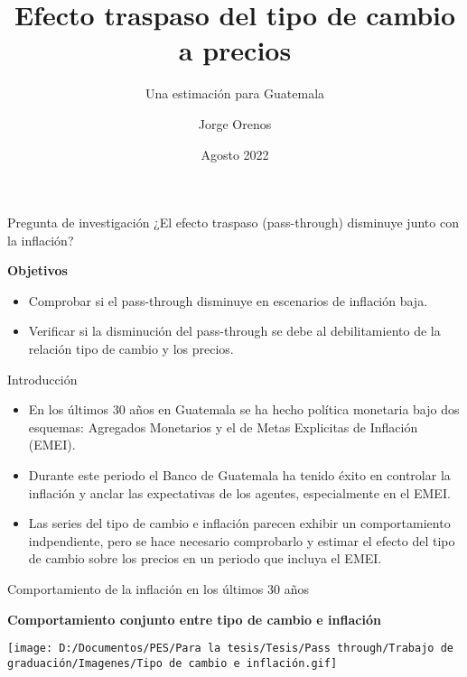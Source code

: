 \documentclass[
  ignorenonframetext,
]{beamer}
\title{Efecto traspaso del tipo de cambio a precios}
\subtitle{Una estimación para Guatemala}
\author{Jorge Orenos}
\date{Agosto 2022}
\providecommand{\tightlist}{%
  \setlength{\itemsep}{0pt}\setlength{\parskip}{0pt}}
\begin{document}
\frame{\titlepage}

\begin{frame}{Pregunta de investigación}
\protect\hypertarget{pregunta-de-investigaciuxf3n}{}
¿El efecto traspaso (pass-through) disminuye junto con la inflación?

\textbf{Objetivos}

\begin{itemize}
\tightlist
\item
  Comprobar si el pass-through disminuye en escenarios de inflación
  baja.
\item
  Verificar si la disminución del pass-through se debe al debilitamiento
  de la relación tipo de cambio y los precios.
\end{itemize}
\end{frame}

\begin{frame}{Introducción}
\protect\hypertarget{introducciuxf3n}{}
\begin{itemize}
\item
  En los últimos 30 años en Guatemala se ha hecho política monetaria
  bajo dos esquemas: Agregados Monetarios y el de Metas Explicitas de
  Inflación (EMEI).
\item
  Durante este periodo el Banco de Guatemala ha tenido éxito en
  controlar la inflación y anclar las expectativas de los agentes,
  especialmente en el EMEI.
\item
  Las series del tipo de cambio e inflación parecen exhibir un
  comportamiento indpendiente, pero se hace necesario comprobarlo y
  estimar el efecto del tipo de cambio sobre los precios en un periodo
  que incluya el EMEI.
\end{itemize}
\end{frame}

\begin{frame}{Comportamiento de la inflación en los últimos 30 años}
\protect\hypertarget{comportamiento-de-la-inflaciuxf3n-en-los-uxfaltimos-30-auxf1os}{}
\end{frame}

\begin{frame}{}
\protect\hypertarget{section}{}
\textbf{Comportamiento conjunto entre tipo de cambio e inflación}

\texttt{[image: D:/Documentos/PES/Para la tesis/Tesis/Pass through/Trabajo de graduación/Imagenes/Tipo de cambio e inflación.gif]}
\end{frame}
\end{document}
